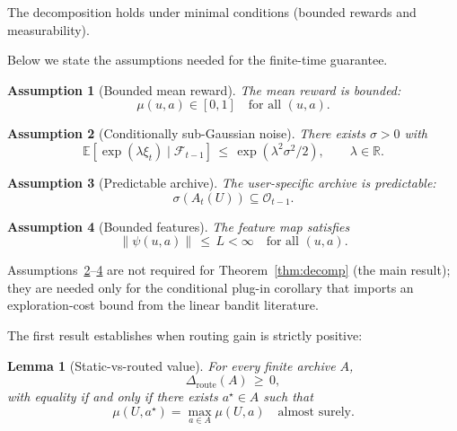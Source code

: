 \documentclass{article} %
\newtheorem{lemma}[theorem]{Lemma}
\newtheorem{assumption}{Assumption}
\providecommand{\E}{\mathbb{E}}
\begin{document}
The decomposition holds under minimal conditions (bounded rewards and measurability).

Below we state the assumptions needed for the finite-time guarantee.

\begin{assumption}[Bounded mean reward]
\label{ass:bounded}
The mean reward is bounded:
\begin{equation}
\label{eq:ass-bounded}
\mu(u,a) \in [0,1] \quad \text{for all } (u,a).
\end{equation}
\end{assumption}

\begin{assumption}[Conditionally sub-Gaussian noise]
\label{ass:subg}
There exists $\sigma > 0$ with
\begin{equation}
\label{eq:ass-subg}
\E\!\left[\exp(\lambda \xi_t) \mid \mathcal{F}_{t-1}\right] \,\le\, \exp(\lambda^2 \sigma^2 / 2), \qquad \lambda \in \mathbb{R}.
\end{equation}
\end{assumption}

\begin{assumption}[Predictable archive]
\label{ass:predictable}
The user-specific archive is predictable:
\begin{equation}
\label{eq:ass-pred}
\sigma(A_t(U)) \subseteq \mathcal{O}_{t-1}.
\end{equation}
\end{assumption}

\begin{assumption}[Bounded features]
\label{ass:bounded-feat}
The feature map satisfies
\begin{equation}
\label{eq:ass-feat}
\|\psi(u,a)\| \,\le\, L < \infty \quad \text{for all } (u,a).
\end{equation}
\end{assumption}

Assumptions~\ref{ass:subg}--\ref{ass:bounded-feat} are not required for Theorem~\ref{thm:decomp} (the main result); they are needed only for the conditional plug-in corollary that imports an exploration-cost bound from the linear bandit literature.

\label{sec:method-lem-het}

The first result establishes when routing gain is strictly positive:

\begin{lemma}[Static-vs-routed value]
\label{lem:hetero}
For every finite archive $A$,
\begin{equation}
\label{eq:lem-hetero}
\Delta_{\mathrm{route}}(A) \,\ge\, 0,
\end{equation}
with equality if and only if there exists $a^\star \in A$ such that
\begin{equation}
\label{eq:lem-hetero-eq}
\mu(U, a^\star) = \max_{a \in A} \mu(U,a) \quad \text{almost surely.}
\end{equation}
\end{lemma}
\end{document}
